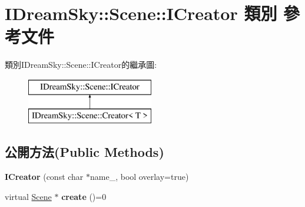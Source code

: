 \hypertarget{class_i_dream_sky_1_1_scene_1_1_i_creator}{}\section{I\+Dream\+Sky\+:\+:Scene\+:\+:I\+Creator 類別 參考文件}
\label{class_i_dream_sky_1_1_scene_1_1_i_creator}
類別\+I\+Dream\+Sky\+:\+:Scene\+:\+:I\+Creator的繼承圖\+:\begin{figure}[H]
\begin{center}
\leavevmode
\includegraphics[height=2.000000cm]{class_i_dream_sky_1_1_scene_1_1_i_creator}
\end{center}
\end{figure}
\subsection*{公開方法(Public Methods)}
\begin{DoxyCompactItemize}
\item 
{\bfseries I\+Creator} (const char $\ast$name\+\_\+, bool overlay=true)\hypertarget{class_i_dream_sky_1_1_scene_1_1_i_creator_ab9b2d38724718182f02aee8ea381c9ec}{}\label{class_i_dream_sky_1_1_scene_1_1_i_creator_ab9b2d38724718182f02aee8ea381c9ec}

\item 
virtual \hyperlink{class_i_dream_sky_1_1_scene}{Scene} $\ast$ {\bfseries create} ()=0\hypertarget{class_i_dream_sky_1_1_scene_1_1_i_creator_aaa12eb436428d09c9723923f4d20d82a}{}\label{class_i_dream_sky_1_1_scene_1_1_i_creator_aaa12eb436428d09c9723923f4d20d82a}

\end{DoxyCompactItemize}
